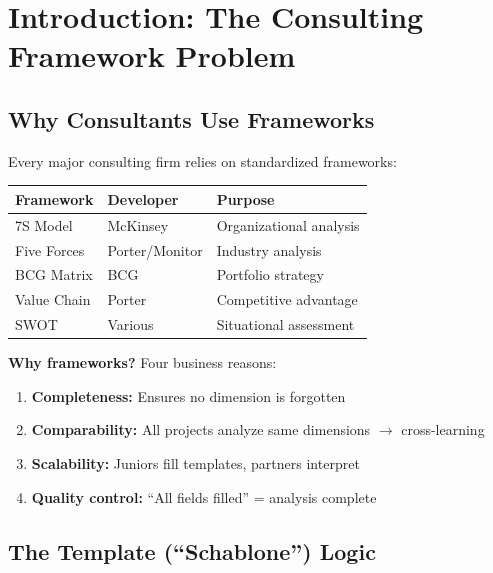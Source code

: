 \section{Introduction: The Consulting Framework Problem}
\label{sec:consulting-intro}

\subsection{Why Consultants Use Frameworks}

Every major consulting firm relies on standardized frameworks:

\begin{center}
\renewcommand{\arraystretch}{1.3}
\begin{tabular}{@{}llp{6cm}@{}}
\toprule
\textbf{Framework} & \textbf{Developer} & \textbf{Purpose} \\
\midrule
7S Model & McKinsey & Organizational analysis \\
Five Forces & Porter/Monitor & Industry analysis \\
BCG Matrix & BCG & Portfolio strategy \\
Value Chain & Porter & Competitive advantage \\
SWOT & Various & Situational assessment \\
\bottomrule
\end{tabular}
\end{center}

\textbf{Why frameworks?} Four business reasons:

\begin{enumerate}
\item \textbf{Completeness:} Ensures no dimension is forgotten
\item \textbf{Comparability:} All projects analyze same dimensions $\rightarrow$ cross-learning
\item \textbf{Scalability:} Juniors fill templates, partners interpret
\item \textbf{Quality control:} ``All fields filled'' = analysis complete
\end{enumerate}

\subsection{The Template (``Schablone'') Logic}

